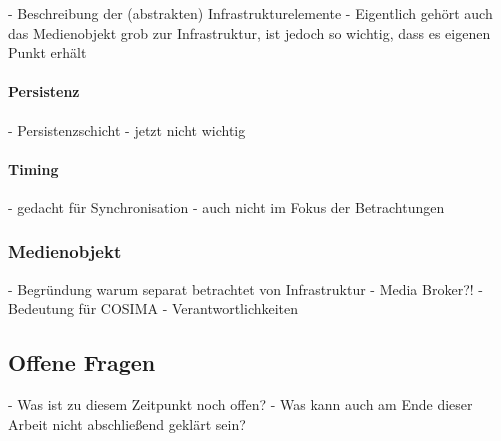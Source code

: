   - Beschreibung der (abstrakten) Infrastrukturelemente
  - Eigentlich gehört auch das Medienobjekt grob zur Infrastruktur, ist jedoch so wichtig, dass es eigenen Punkt erhält

\paragraph{Persistenz} %
\label{par:persistenz}

  - Persistenzschicht
  - jetzt nicht wichtig


\paragraph{Timing} %
\label{par:timing}

  - gedacht für Synchronisation
  - auch nicht im Fokus der Betrachtungen



\subsubsection{Medienobjekt} %
\label{ssub:medienobjekt}

  - Begründung warum separat betrachtet von Infrastruktur
  - Media Broker?!
  - Bedeutung für COSIMA
  - Verantwortlichkeiten



\subsection{Offene Fragen} %
\label{sub:offene_fragen}

  - Was ist zu diesem Zeitpunkt noch offen?
  - Was kann auch am Ende dieser Arbeit nicht abschließend geklärt sein?



